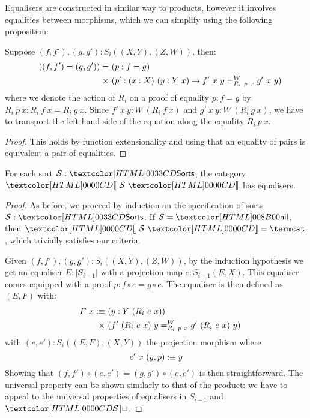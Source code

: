 Equalisers are constructed in similar way to products, however it
involves equalities between morphisms, which we can simplify using the
following proposition:

\begin{proposition}
  Suppose $(f,f'), (g,g') : S_i((X,Y),(Z,W))$, then:
  \begin{align*}
    &&((f,f') = (g,g')) =&\ (p : f = g) \\
    &&\times&\ (p' : (x : X)\ (y : Y\ x) \to \pathover{W}{R_i\ p\ x}{f'\ x\ y}{g'\ x\ y})
  \end{align*}
  where we denote the action of $R_i$ on a proof of equality
  $p : f = g$ by $R_i\ p\ x : R_i\ f\ x = R_i\ g\ x$. Since
  $f'\ x\ y : W\ (R_i\ f\ x)$ and $g'\ x\ y : W\ (R_i\ g\ x)$, we have
  to transport the left hand side of the equation along the equality
  $R_i\ p\ x$.
\end{proposition}

\begin{proof}
  This holds by function extensionality and using that an equality of
  pairs is equivalent a pair of equalities.
\end{proof}
\begin{lemma}
\label{sorts-equalisers}
  For each sort $\Ss : \sortsty$, the category $\SortCat{\Ss}$ has
  equalisers.
\end{lemma}

\begin{proof}
  As before, we proceed by induction on the specification of sorts
  $\Ss : \sortsty$.  If $\Ss = \sortsnil$, then $\SortCat{\Ss} = \termcat$,
  which trivially satisfies our criteria.



  Given $(f,f'), (g,g') : S_i((X,Y),(Z,W))$, by the induction
  hypothesis we get an equaliser $E : |S_{i-1}|$ with a projection map
  $e : S_{i-1}(E,X)$. This equaliser comes equipped with a proof
  $p : f \circ e = g \circ e$. The equaliser is then defined as
  $(E,F)$ with:
  \begin{align*}
    &&F\ x \ddefeq&\ (y : Y\ (R_i\ e\ x)) \\
    && \times&\ (\pathover{W}{R_i\ p\ x}{f'\ (R_i\ e\ x)\ y}{g'\ (R_i\ e\ x)\ y})
  \end{align*}
  with $(e,e') : S_i((E,F),(X,Y))$ the projection morphism where
  $$
  e'\ x\ (y , p) \ddefeq y
  $$
  Showing that $(f,f') \circ (e,e') = (g,g') \circ (e,e')$ is then
  straightforward. The universal property can be shown similarly to
  that of the product: we have to appeal to the universal properties
  of equalisers in $S_{i-1}$ and $\SET$.
\end{proof}

